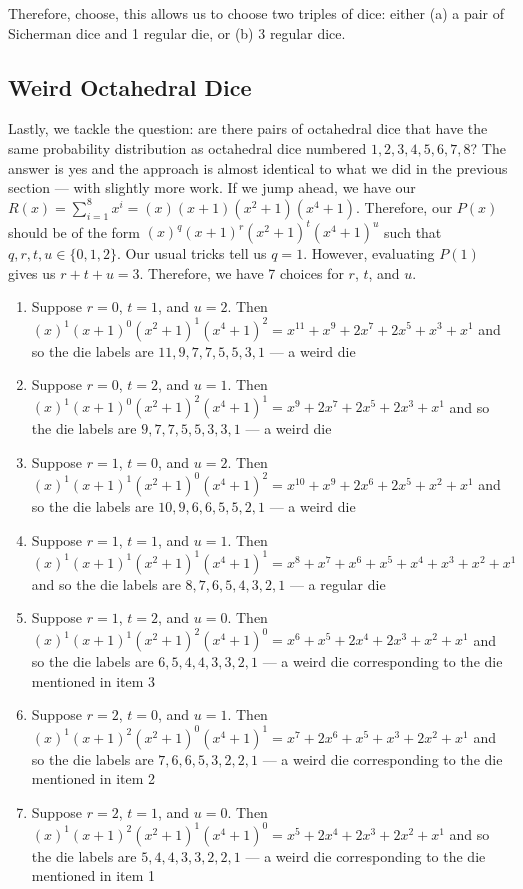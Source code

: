 \documentclass[12pt]{report}
\begin{document}
Therefore, choose, this allows us to choose two triples of dice: either (a) a pair of Sicherman dice and 1 regular die, or (b) 3 regular dice.

\subsection*{Weird Octahedral Dice}
Lastly, we tackle the question: are there pairs of octahedral dice that have the same probability distribution
as octahedral dice numbered $1,2,3,4,5,6,7,8$? The answer is yes and the approach is almost identical to what
we did in the previous section --- with slightly more work. If we jump ahead, we have our
$R(x)=\sum_{i=1}^{8} x^{i}=(x)(x+1)(x^{2}+1)(x^{4}+1)$. Therefore, our $P(x)$ should be of the form
$(x)^{q}(x+1)^{r}(x^{2}+1)^{t}(x^{4}+1)^{u}$ such that $q,r,t,u \in \{0,1,2\}$. Our usual tricks tell us
$q=1$. However, evaluating $P(1)$ gives us $r+t+u=3$. Therefore, we have 7 choices for $r$, $t$, and $u$.

\begin{enumerate}
\item Suppose $r=0$, $t=1$, and $u=2$. Then $(x)^{1}(x+1)^{0}(x^{2}+1)^{1}(x^{4}+1)^{2}=x^{11}+x^{9}+2x^{7}+2x^{5}+x^{3}+x^{1}$ and so the die labels are $11,9,7,7,5,5,3,1$ --- a weird die
\item Suppose $r=0$, $t=2$, and $u=1$. Then $(x)^{1}(x+1)^{0}(x^{2}+1)^{2}(x^{4}+1)^{1}=x^{9}+2x^{7}+2x^{5}+2x^{3}+x^{1}$ and so the die labels are $9,7,7,5,5,3,3,1$ --- a weird die
\item Suppose $r=1$, $t=0$, and $u=2$. Then $(x)^{1}(x+1)^{1}(x^{2}+1)^{0}(x^{4}+1)^{2}=x^{10}+x^{9}+2x^{6}+2x^{5}+x^{2}+x^{1}$ and so the die labels are $10,9,6,6,5,5,2,1$ --- a weird die
\item Suppose $r=1$, $t=1$, and $u=1$. Then $(x)^{1}(x+1)^{1}(x^{2}+1)^{1}(x^{4}+1)^{1}=x^{8}+x^{7}+x^{6}+x^{5}+x^{4}+x^{3}+x^{2}+x^{1}$ and so the die labels are $8,7,6,5,4,3,2,1$ --- a regular die
\item Suppose $r=1$, $t=2$, and $u=0$. Then $(x)^{1}(x+1)^{1}(x^{2}+1)^{2}(x^{4}+1)^{0}=x^{6}+x^{5}+2x^{4}+2x^{3}+x^{2}+x^{1}$ and so the die labels are $6,5,4,4,3,3,2,1$ --- a weird die corresponding to the die mentioned in item 3
\item Suppose $r=2$, $t=0$, and $u=1$. Then $(x)^{1}(x+1)^{2}(x^{2}+1)^{0}(x^{4}+1)^{1}=x^{7}+2x^{6}+x^{5}+x^{3}+2x^{2}+x^{1}$ and so the die labels are $7,6,6,5,3,2,2,1$ --- a weird die corresponding to the die mentioned in item 2
\item Suppose $r=2$, $t=1$, and $u=0$. Then $(x)^{1}(x+1)^{2}(x^{2}+1)^{1}(x^{4}+1)^{0}=x^{5}+2x^{4}+2x^{3}+2x^{2}+x^{1}$ and so the die labels are $5,4,4,3,3,2,2,1$ --- a weird die corresponding to the die mentioned in item 1
\end{enumerate}
\end{document}
